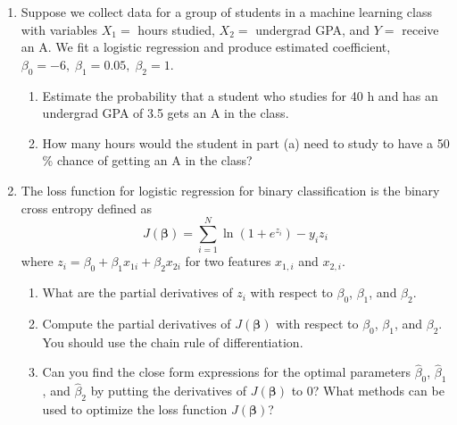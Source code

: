 \documentclass[11pt]{article}
\def\betabf{{\boldsymbol \beta}}
\begin{document}
\begin{enumerate}
\begin{enumerate}[(a)]
\end{enumerate}

\item Suppose we collect data for a group of students in a machine learning class
with variables $X_1 =$ hours studied, $X_2 =$ undergrad GPA, and $Y =$
receive an A. We fit a logistic regression and produce estimated
coefficient, $\beta_0 = -6, \;\beta_1 = 0.05,\; \beta_2 = 1$.

\begin{enumerate}
    \item  Estimate the probability that a student who studies for 40 h and
has an undergrad GPA of 3.5 gets an A in the class.


\item  How many hours would the student in part (a) need to study to
have a 50 \% chance of getting an A in the class?
\end{enumerate}

\item The loss function for logistic regression for binary classification is the binary cross entropy defined as $$J(\betabf)=\sum_{i=1}^N\ln(1+e^{z_i})-y_iz_i$$ where $z_i = \beta_0+\beta_1x_{1i}+\beta_2x_{2i}$ for two features $x_{1,i}$ and $x_{2,i}$.
\begin{enumerate}
    \item What are the partial derivatives of $z_i$ with respect to $\beta_0$, $\beta_1$, and $\beta_2$.
    \item Compute the partial derivatives of $J(\betabf)$ with respect to $\beta_0$, $\beta_1$, and $\beta_2$. You should use the chain rule of differentiation.
    \item Can you find the close form expressions for the optimal parameters $\hat{\beta}_0$, $\hat{\beta}_1$, and $\hat{\beta}_2$ by putting the derivatives of $J(\betabf)$ to 0? What methods can be used to optimize the loss function $J(\betabf)$?
\end{enumerate}
\end{enumerate}
\end{document}
